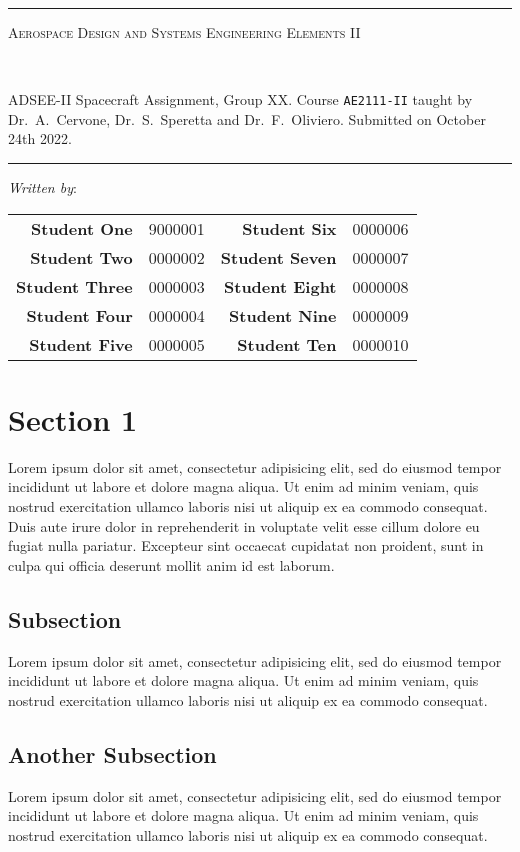 \documentclass[a4paper, 12pt, twoside, dvipsnames]{article}
\makeatletter
\newcommand{\docsubject}{ADSEE-II Spacecraft Assignment}
\newcommand{\doctitle}{Aerospace Design and Systems Engineering Elements II}
\newcommand{\coursecode}{AE2111-II}
\newcommand{\teacher}{Dr.~A.~Cervone,  Dr.~S.~Speretta and Dr.~F.~Oliviero}
\newcommand{\groupname}{Group XX}
\newcommand{\authors}{
    \begin{tabular}{rlrl}
        \textbf{Student One} & 9000001 & \textbf{Student Six} & 0000006 \\
        \textbf{Student Two} & 0000002 & \textbf{Student Seven} & 0000007\\
        \textbf{Student Three} & 0000003 & \textbf{Student Eight} & 0000008 \\
        \textbf{Student Four} & 0000004 & \textbf{Student Nine} & 0000009 \\
        \textbf{Student Five} & 0000005 & \textbf{Student Ten} & 0000010 \\
    \end{tabular}}
\newcommand{\submissiondate}{October 24th 2022}
\newcommand{\Hrule}{\rule{\linewidth}{0.4mm}}
\renewcommand{\tableofcontents}{%
  \@starttoc{toc}%
}
\makeatother
\begin{document}
\thispagestyle{empty}
\begin{titlepage}
\begin{center}
\vspace*{1cm}
\Hrule
\vspace*{0.3cm}
\parbox{\textwidth}{\centering\scshape\fontsize{34pt}{34pt}\selectfont \doctitle \par}
\phantom{.}\vspace*{0.5cm}\\
\parbox{\textwidth}{\centering\fontsize{12pt}{12pt}\selectfont \docsubject, \groupname. Course \texttt{\coursecode} taught by \teacher. Submitted on \submissiondate.}
\Hrule
\vspace*{0.75cm}
{\centering \emph{Written by}: \\ \authors}
\begin{tcolorbox}[width=0.6\textwidth, arc=0mm, bottom=15pt, colback=white, colframe=black]
    \tableofcontents
\end{tcolorbox}
\end{center}
\end{titlepage}

\section{Section 1}
Lorem ipsum dolor sit amet, consectetur adipisicing elit, sed do eiusmod
tempor incididunt ut labore et dolore magna aliqua. Ut enim ad minim veniam,
quis nostrud exercitation ullamco laboris nisi ut aliquip ex ea commodo
consequat. Duis aute irure dolor in reprehenderit in voluptate velit esse
cillum dolore eu fugiat nulla pariatur. Excepteur sint occaecat cupidatat non
proident, sunt in culpa qui officia deserunt mollit anim id est laborum.

\subsection{Subsection}
Lorem ipsum dolor sit amet, consectetur adipisicing elit, sed do eiusmod
tempor incididunt ut labore et dolore magna aliqua. Ut enim ad minim veniam,
quis nostrud exercitation ullamco laboris nisi ut aliquip ex ea commodo
consequat. 

\subsection{Another Subsection}
Lorem ipsum dolor sit amet, consectetur adipisicing elit, sed do eiusmod
tempor incididunt ut labore et dolore magna aliqua. Ut enim ad minim veniam,
quis nostrud exercitation ullamco laboris nisi ut aliquip ex ea commodo
consequat. 
\end{document}
